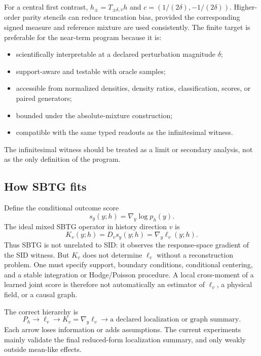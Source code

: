 \documentclass[10pt]{article}
\begin{document}
For a central first contrast, \(h_\pm=T_{\pm\delta,v}h\) and \(c=(1/(2\delta),-1/(2\delta))\). Higher-order parity stencils can reduce truncation bias, provided the corresponding signed measure and reference mixture are used consistently. The finite target is preferable for the near-term program because it is:

\begin{itemize}
  \item scientifically interpretable at a declared perturbation magnitude \(\delta\);
  \item support-aware and testable with oracle samples;
  \item accessible from normalized densities, density ratios, classification, scores, or paired generators;
  \item bounded under the absolute-mixture construction;
  \item compatible with the same typed readouts as the infinitesimal witness.
\end{itemize}

The infinitesimal witness should be treated as a limit or secondary analysis, not as the only definition of the program.

\subsection{How SBTG fits}

Define the conditional outcome score
\[
  s_y(y;h)=\nabla_y\log p_h(y).
\]
The ideal mixed SBTG operator in history direction \(v\) is
\begin{equation}
  K_v(y;h)=D_v s_y(y;h)=\nabla_y\ell_v(y;h).
  \label{eq:sbtg}
\end{equation}
Thus SBTG is not unrelated to SID: it observes the response-space gradient of the SID witness. But \(K_v\) does not determine \(\ell_v\) without a reconstruction problem. One must specify support, boundary conditions, conditional centering, and a stable integration or Hodge/Poisson procedure. A local cross-moment of a learned joint score is therefore not automatically an estimator of \(\ell_v\), a physical field, or a causal graph.

The correct hierarchy is
\[
  P_h \longrightarrow \ell_v
  \longrightarrow K_v=\nabla_y\ell_v
  \longrightarrow \text{a declared localization or graph summary}.
\]
Each arrow loses information or adds assumptions. The current experiments mainly validate the final reduced-form localization summary, and only weakly outside mean-like effects.
\end{document}
